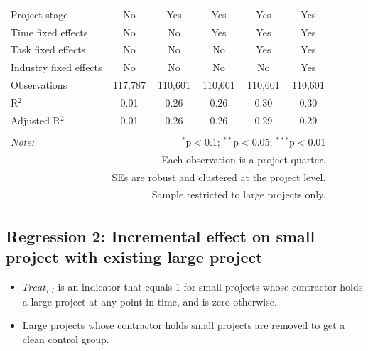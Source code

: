 \documentclass[
]{article}
\providecommand{\tightlist}{%
  \setlength{\itemsep}{0pt}\setlength{\parskip}{0pt}}
\begin{document}
\begin{table}[H]
\begin{tabular}{@{\extracolsep{-10pt}}lccccc}
Project stage & No & Yes & Yes & Yes & Yes \\ 
Time fixed effects & No & No & Yes & Yes & Yes \\ 
Task fixed effects & No & No & No & Yes & Yes \\ 
Industry fixed effects & No & No & No & No & Yes \\ 
Observations & 117,787 & 110,601 & 110,601 & 110,601 & 110,601 \\ 
R$^{2}$ & 0.01 & 0.26 & 0.26 & 0.30 & 0.30 \\ 
Adjusted R$^{2}$ & 0.01 & 0.26 & 0.26 & 0.29 & 0.29 \\ 
\hline 
\hline \\[-1.8ex] 
\textit{Note:}  & \multicolumn{5}{r}{$^{*}$p$<$0.1; $^{**}$p$<$0.05; $^{***}$p$<$0.01} \\ 
 & \multicolumn{5}{r}{Each observation is a project-quarter.} \\ 
 & \multicolumn{5}{r}{SEs are robust and clustered at the project level.} \\ 
 & \multicolumn{5}{r}{Sample restricted to large projects only.} \\ 
\end{tabular} 
\end{table}

\hypertarget{regression-2-incremental-effect-on-small-project-with-existing-large-project}{%
\subsection{Regression 2: Incremental effect on small project with
existing large
project}\label{regression-2-incremental-effect-on-small-project-with-existing-large-project}}

\begin{itemize}
\tightlist
\item
  \(Treat_{i,l}\) is an indicator that equals 1 for small projects whose
  contractor holds a large project at any point in time, and is zero
  otherwise.
\item
  Large projects whose contractor holds small projects are removed to
  get a clean control group.
\end{itemize}
\end{document}
